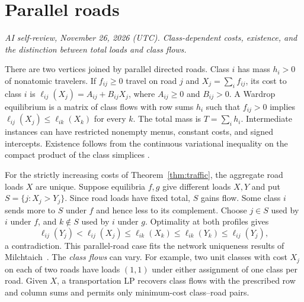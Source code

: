 \documentclass[11pt,oneside,openany,notitlepage]{report}
\newcommand{\reviewdate}{November 26, 2026 (UTC)}
\newcommand{\reviewmark}[1]{\par\nopagebreak[4]\noindent
  {\footnotesize\itshape AI self-review, \reviewdate. #1\par}\nobreak\smallskip}
\begin{document}
\section{Parallel roads}
\reviewmark{Class-dependent costs, existence, and the distinction between total loads and class flows.}
There are two vertices joined by parallel directed roads. Class \(i\) has
mass \(h_i>0\) of nonatomic travelers. If \(f_{ij}\ge0\) travel on road \(j\)
and \(X_j=\sum_i f_{ij}\), its cost to class \(i\) is
\(\ell_{ij}(X_j)=A_{ij}+B_{ij}X_j\), where \(A_{ij}\ge0\) and \(B_{ij}>0\).
A Wardrop equilibrium is a matrix of class flows with row sums \(h_i\)
such that \(f_{ij}>0\) implies
\(\ell_{ij}(X_j)\le\ell_{ik}(X_k)\) for every \(k\). The total mass is
\(T=\sum_i h_i\). Intermediate instances can have restricted nonempty menus,
constant costs, and signed intercepts. Existence follows from the continuous
variational inequality on the compact product of the class simplices
\cite{mp}.

For the strictly increasing costs of Theorem~\ref{thm:traffic}, the
aggregate road loads \(X\) are unique. Suppose equilibria \(f,g\) give
different loads \(X,Y\) and put \(S=\{j:X_j>Y_j\}\). Since road loads
have fixed total, \(S\) gains flow. Some class \(i\) sends more to \(S\)
under \(f\) and hence less to its complement. Choose \(j\in S\) used
by \(i\) under \(f\), and \(k\notin S\) used by \(i\) under \(g\).
Optimality at both profiles gives
\[
 \ell_{ij}(Y_j)<\ell_{ij}(X_j)\le\ell_{ik}(X_k)
       \le\ell_{ik}(Y_k)\le\ell_{ij}(Y_j),
\]
a contradiction. This parallel-road case fits the network uniqueness
results of Milchtaich~\cite{milchtaich}. The \emph{class flows} can vary.
For example, two unit classes with cost \(X_j\) on each of two roads
have loads \((1,1)\) under either assignment of one class per road.
Given \(X\), a transportation LP recovers class flows with the prescribed
row and column sums and permits only minimum-cost class--road pairs.
\end{document}
